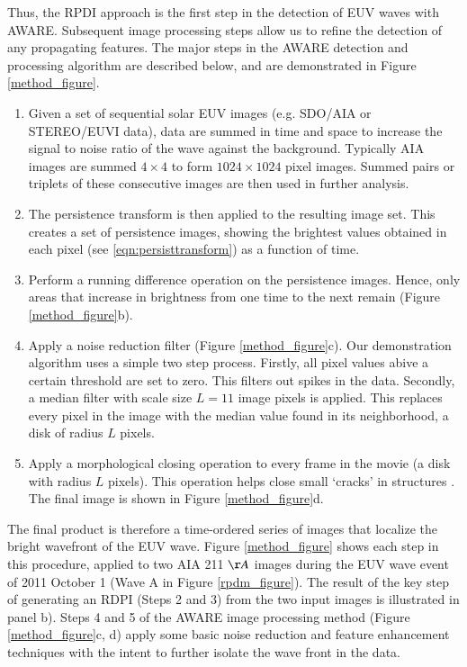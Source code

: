 Thus, the RPDI approach is the first step in the detection of EUV
waves with AWARE. Subsequent image processing steps allow us to refine
the detection of any propagating features. The major steps in the
AWARE detection and processing algorithm are described below, and are
demonstrated in Figure \ref{method_figure}.

\begin{enumerate}

\item Given a set of sequential solar EUV images (e.g. SDO/AIA or
  STEREO/EUVI data), data are summed in time and space to increase the
  signal to noise ratio of the wave against the background.  Typically
  AIA images are summed $4\times4$ to form $1024\times1024$ pixel
  images.  Summed pairs or triplets of these consecutive images are
  then used in further analysis.

\item The persistence transform is then applied to the resulting image
  set.  This creates a set of persistence images, showing the
  brightest values obtained in each pixel (see
  \ref{eqn:persisttransform}) as a function of time.

\item Perform a running difference operation on the
  persistence images. Hence, only areas that increase in brightness
  from one time to the next remain (Figure \ref{method_figure}b).

\item Apply a noise reduction filter (Figure \ref{method_figure}c).
  Our demonstration algorithm uses a simple two step process.
  Firstly, all pixel values abive a certain threshold are set to
  zero. This filters out spikes in the data. Secondly, a median filter
  with scale size $L=11$ image pixels is applied.  This replaces every
  pixel in the image with the median value found in its neighborhood,
  a disk of radius $L$ pixels.

\item Apply a morphological closing \citep{2002dip..book.....G}
  operation to every frame in the movie (a disk with radius $L$
  pixels).  This operation helps close small ‘cracks’ in structures
  \citep{2002dip..book.....G}.  The final image is shown in Figure
  \ref{method_figure}d.
\end{enumerate}

The final product is therefore a time-ordered series of images that
localize the bright wavefront of the EUV wave. Figure
\ref{method_figure} shows each step in this procedure, applied to two
AIA 211 $\AA$ images during the EUV wave event of 2011 October 1 (Wave
A in Figure \ref{rpdm_figure}). The result of the key step of
generating an RDPI (Steps 2 and 3) from the two input images is
illustrated in panel b). Steps 4 and 5 of the AWARE image processing
method (Figure \ref{method_figure}c, d) apply some basic noise
reduction and feature enhancement techniques with the intent to
further isolate the wave front in the data.

